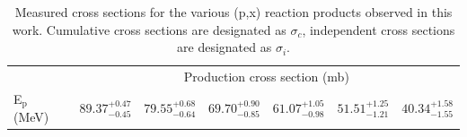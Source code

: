 \begin{table}
\centering
\caption{Measured cross sections for the various (p,x) reaction products observed in this work. Cumulative cross sections are designated as $\sigma_c$, independent cross sections are designated as $\sigma_i$.}
\label{tab:ti_rp_table}
\small
\begin{tabular}{@{}lllllll@{}}
\toprule
                            & \multicolumn{6}{c}{Production cross section (mb)}                                                                                                         \\ \cmidrule(l){2-7} 
E$_\text{p}$ (MeV)          & $89.37^{+0.47}_{-0.45}$ & $79.55^{+0.68}_{-0.64}$ & $69.70^{+0.90}_{-0.85}$ & $61.07^{+1.05}_{-0.98}$ & $51.51^{+1.25}_{-1.21}$ & $40.34^{+1.58}_{-1.55}$ \\ \midrule

\end{tabular}
\end{table}

